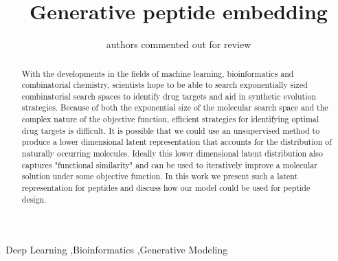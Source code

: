 \documentclass[preprint,12pt]{elsarticle}
\begin{document}
\begin{frontmatter}


\title{Generative peptide embedding}




\author{authors commented out for review}

\begin{abstract}
With the developments in the fields of machine learning, bioinformatics and combinatorial chemistry, scientists hope to be able to search exponentially sized combinatorial search spaces to identify drug targets and aid in synthetic evolution strategies. Because of both the exponential size of the molecular search space and the complex nature of the objective function, efficient strategies for identifying optimal drug targets is difficult. It is possible that we could use an unsupervised method to produce a lower dimensional latent representation that accounts for the distribution of naturally occurring molecules. Ideally this lower dimensional latent distribution also captures "functional similarity" and can be used to iteratively improve a molecular solution under some objective function. In this work we present such a latent representation for peptides and discuss how our model could be used for peptide design.
\end{abstract}

\begin{keyword}
Deep Learning \sep Bioinformatics \sep Generative Modeling


\end{keyword}

\end{frontmatter}
\end{document}
